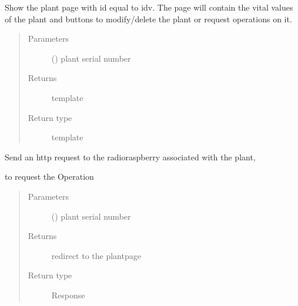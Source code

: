 \documentclass[letterpaper,10pt,english]{sphinxmanual}
\begin{document}

\begin{fulllineitems}
\label{\detokenize{index:view.plant.plant_page}}
Show the plant page with id equal to idv.
The page will contain the vital values of the plant and buttons
to modify/delete the plant or request operations on it.
\begin{quote}\begin{description}
\item[{Parameters}] \leavevmode
{} () \textendash{} plant serial number

\item[{Returns}] \leavevmode
template 

\item[{Return type}] \leavevmode
template

\end{description}\end{quote}

\end{fulllineitems}


\begin{fulllineitems}
\label{\detokenize{index:view.plant.temperature}}
Send an http request to the radio\sphinxhyphen{}raspberry associated with the plant,

to request the  Operation
\begin{quote}\begin{description}
\item[{Parameters}] \leavevmode
{} () \textendash{} plant serial number

\item[{Returns}] \leavevmode
redirect to the plantpage

\item[{Return type}] \leavevmode
Response

\end{description}\end{quote}

\end{fulllineitems}
\end{document}
